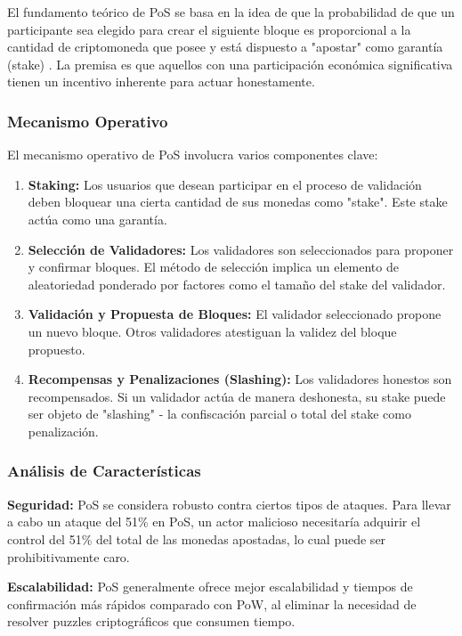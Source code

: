 \documentclass[spanish,12pt,letterpaper]{report}
\begin{document}
El fundamento teórico de PoS se basa en la idea de que la probabilidad de que un participante sea elegido para crear el siguiente bloque es proporcional a la cantidad de criptomoneda que posee y está dispuesto a "apostar" como garantía (stake) \parencite{investopedia2024pos}. La premisa es que aquellos con una participación económica significativa tienen un incentivo inherente para actuar honestamente.

\subsubsection{Mecanismo Operativo}

El mecanismo operativo de PoS involucra varios componentes clave:

\begin{enumerate}
    \item \textbf{Staking:} Los usuarios que desean participar en el proceso de validación deben bloquear una cierta cantidad de sus monedas como "stake". Este stake actúa como una garantía.
    \item \textbf{Selección de Validadores:} Los validadores son seleccionados para proponer y confirmar bloques. El método de selección implica un elemento de aleatoriedad ponderado por factores como el tamaño del stake del validador.
    \item \textbf{Validación y Propuesta de Bloques:} El validador seleccionado propone un nuevo bloque. Otros validadores atestiguan la validez del bloque propuesto.
    \item \textbf{Recompensas y Penalizaciones (Slashing):} Los validadores honestos son recompensados. Si un validador actúa de manera deshonesta, su stake puede ser objeto de "slashing" - la confiscación parcial o total del stake como penalización.
\end{enumerate}

\subsubsection{Análisis de Características}

\textbf{Seguridad:} PoS se considera robusto contra ciertos tipos de ataques. Para llevar a cabo un ataque del 51\% en PoS, un actor malicioso necesitaría adquirir el control del 51\% del total de las monedas apostadas, lo cual puede ser prohibitivamente caro.

\textbf{Escalabilidad:} PoS generalmente ofrece mejor escalabilidad y tiempos de confirmación más rápidos comparado con PoW, al eliminar la necesidad de resolver puzzles criptográficos que consumen tiempo.
\end{document}
